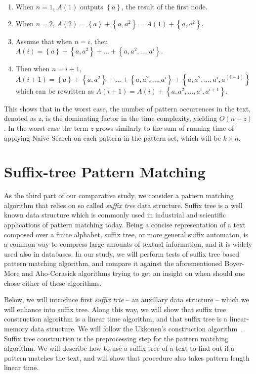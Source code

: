 \documentclass[paper=a4, fontsize=11pt]{scrartcl} %
\numberwithin{equation}{section} %
\numberwithin{figure}{section} %
\numberwithin{table}{section} %
\begin{document}
\begin{enumerate}
  \item When $n = 1$, $A(1)$ outputs $\left\{a\right\}$, the result of the first node.
  \item When $n = 2$, $A(2) = \left\{a\right\} + \left\{a, a^2\right\} = A(1) + \left\{a, a^2\right\}$.
  \item Assume that when $n = i$, then $A(i) =  \left\{a\right\} + \left\{a, a^2\right\} + \dots + \left\{a, a^2, ..., a^i\right\}$.
  \item Then when $n = i+1$, $A(i+1) = \left\{a\right\} + \left\{a, a^2\right\} + \dots + \left\{a, a^2, ..., a^i\right\} + \left\{a, a^2, ..., a^i, a^(i+1)\right\}$ which can be rewritten as  $A(i+1) = A(i) + \left\{a, a^2, ..., a^i, a^{i+1}\right\}$.
\end{enumerate}
This shows that in the worst case, the number of pattern occurrences in the text, denoted as z, is the dominating factor in the time complexity, yielding $O(n+z)$. In the worst case the term $z$ grows similarly to the sum of running time of applying Naive Search on each pattern in the pattern set, which will be $k\times n$.

\newpage
\section{Suffix-tree Pattern Matching}
\par As the third part of our comparative study, we consider a pattern matching algorithm that relies on so called \textit{suffix tree} data structure. Suffix tree is a well known data structure which is commonly used in industrial and scientific applications of pattern matching today. Being a concise representation of a text composed over a finite alphabet, suffix tree, or more general suffix automaton, is a common way to compress large amounts of textual information, and it is widely used also in databases. In our study, we will perform tests of suffix tree based pattern matching algorithm, and compare it against the aforementioned Boyer-More and Aho-Corasick algorithms trying to get an insight on when should one chose either of these algorithms.

\par Below, we will introduce first \textit{suffix trie} -- an auxillary data structure -- which we will enhance into suffix tree. Along this way, we will show that suffix tree construction algorithm is a linear time algorithm, and that suffix tree is a linear-memory data structure. We will follow the Ukkonen's construction algorithm~\cite{ukkonen1995line}. Suffix tree construction is the preprocessing step for the pattern matching algorithm. We will describe how to use a suffix tree of a text to find out if a pattern matches the text, and will show that procedure also takes pattern length linear time.
\end{document}
